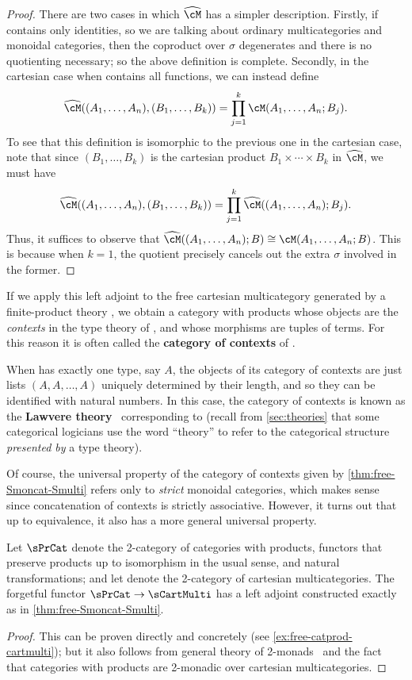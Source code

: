 \begin{proof}
  There are two cases in which $\catctx\cM$ has a simpler description.
  Firstly, if \fS contains only identities, so we are talking about ordinary multicategories and monoidal categories, then the coproduct over $\sigma$ degenerates and there is no quotienting necessary; so the above definition is complete.
  Secondly, in the cartesian case when \fS contains all functions, we can instead define
  \[\catctx\cM((A_1,\dots,A_n),(B_1,\dots,B_k)) =
  \prod_{j=1}^k \cM(A_1,\dots,A_n; B_j).
  \]
  To see that this definition is isomorphic to the previous one in the cartesian case, note that since $(B_1,\dots,B_k)$ is the cartesian product $B_1\times \cdots \times B_k$ in $\catctx\cM$, we must have
  \[\catctx\cM((A_1,\dots,A_n),(B_1,\dots,B_k)) =
  \prod_{j=1}^k \catctx\cM((A_1,\dots,A_n); B_j).
  \]
  Thus, it suffices to observe that $\catctx\cM((A_1,\dots,A_n); B) \cong \cM(A_1,\dots,A_n; B)$.
  This is because when $k=1$, the quotient precisely cancels out the extra $\sigma$ involved in the former.
\end{proof}

If we apply this left adjoint to the free cartesian multicategory generated by a finite-product theory \cP, we obtain a category with products whose objects are the \emph{contexts} in the type theory of \cP, and whose morphisms are tuples of terms.
For this reason it is often called the \textbf{category of contexts} of \cP.

When \cP has exactly one type, say $A$, the objects of its category of contexts are just lists $(A,A,\dots,A)$ uniquely determined by their length, and so they can be identified with natural numbers.
In this case, the category of contexts is known as the \textbf{Lawvere theory}~\cite{lawvere:functsem} corresponding to \cP (recall from \cref{sec:theories} that some categorical logicians use the word ``theory'' to refer to the categorical structure \emph{presented by} a type theory).

Of course, the universal property of the category of contexts given by \cref{thm:free-Smoncat-Smulti} refers only to \emph{strict} monoidal categories, which makes sense since concatenation of contexts is strictly associative.
However, it turns out that up to equivalence, it also has a more general universal property.

\begin{thm}\label{thm:free-catprod-cartmulti}
  Let $\sPrCat$ denote the 2-category of categories with products, functors that preserve products up to isomorphism in the usual sense, and natural transformations; and let \sCartMulti denote the 2-category of cartesian multicategories.
  The forgetful functor $\sPrCat\to\sCartMulti$ has a left adjoint constructed exactly as in \cref{thm:free-Smoncat-Smulti}.
\end{thm}
\begin{proof}
  This can be proven directly and concretely (see \cref{ex:free-catprod-cartmulti}); but it also follows from general theory of 2-monads~\cite{bkp:2dmonads} and the fact that categories with products are 2-monadic over cartesian multicategories.
\end{proof}

